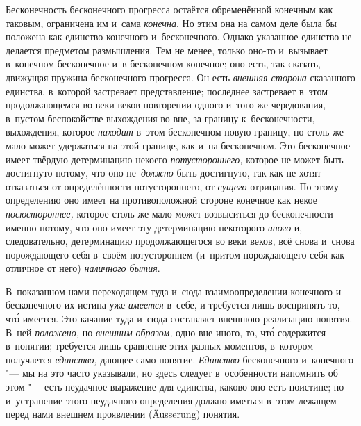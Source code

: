 Бесконечность бесконечного прогресса остаётся обременённой конечным как
таковым, ограничена им и~сама {\em конечна}. Но этим
она на самом деле была бы положена как единство конечного и~бесконечного.
Однако указанное единство не делается предметом размышления. Тем не менее,
только оно-то и~вызывает в~конечном бесконечное и~в бесконечном конечное;
оно есть, так сказать, движущая пружина бесконечного прогресса. Он есть
{\em внешняя сторона} сказанного единства, в~которой
застревает представление; последнее застревает в~этом продолжающемся во
веки веков повторении одного и~того же чередования, в~пустом беспокойстве
выхождения во вне, за границу к~бесконечности, выхождения, которое
{\em находит} в~этом бесконечном новую границу, но
столь же мало может удержаться на этой границе, как и~на бесконечном. Это
бесконечное имеет твёрдую детерминацию некоего
{\em потустороннего,} которое не может быть достигнуто
потому, что оно не~{\em должно} быть достигнуто, так
как не хотят отказаться от определённости потустороннего, от
{\em сущего} отрицания. По этому определению оно имеет
на противоположной стороне конечное как некое
{\em посюстороннее,} которое столь же мало может
возвыситься до бесконечности именно потому, что оно имеет эту детерминацию
некоторого {\em иного} и, следовательно, детерминацию
продолжающегося во веки веков, всё снова и~снова порождающего себя в~своём
потустороннем (и~притом порождающего себя как отличное от него)
{\em наличного бытия}.


В~показанном нами переходящем туда и~сюда взаимоопределении конечного и
бесконечного их истина уже {\em имеется} в~себе, и
требуется лишь воспринять то, чт\'{о} имеется. Это качание туда и~сюда
составляет внешнюю реализацию понятия. В~ней
{\em положено,} но {\em внешним
образом,} одно вне иного, то, чт\'{о} содержится в~понятии; требуется лишь
сравнение этих разных моментов, в~котором получается
{\em единство,} дающее само понятие.
{\em Единство} бесконечного и~конечного "--- мы на это
часто указывали, но здесь следует в~особенности напомнить об этом "--- есть
неудачное выражение для единства, каково оно есть поистине; но и~устранение
этого неудачного определения должно иметься в~этом лежащем перед нами
внешнем проявлении (Äusserung) понятия.

